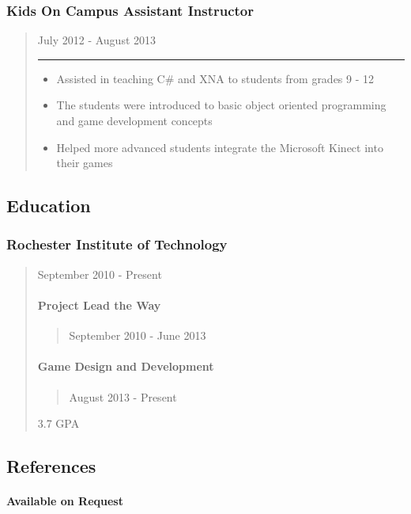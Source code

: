 \documentclass[a4paper,12pt]{article}
\begin{document}
\subsubsection{Kids On Campus Assistant
Instructor}\label{kids-on-campus-assistant-instructor}

\begin{quote}
July 2012 - August 2013

\begin{center}\rule{3in}{0.4pt}\end{center}

\begin{itemize}
\itemsep1pt\parskip0pt
\item
  Assisted in teaching C\# and XNA to students from grades 9 - 12
\item
  The students were introduced to basic object oriented programming and
  game development concepts
\item
  Helped more advanced students integrate the Microsoft Kinect into
  their games
\end{itemize}
\end{quote}

\subsection{Education}\label{education}

\subsubsection{Rochester Institute of
Technology}\label{rochester-institute-of-technology}

\begin{quote}
September 2010 - Present

\paragraph{Project Lead the Way}\label{project-lead-the-way}

\begin{quote}
September 2010 - June 2013
\end{quote}

\paragraph{Game Design and
Development}\label{game-design-and-development}

\begin{quote}
August 2013 - Present
\end{quote}

3.7 GPA
\end{quote}

\subsection{References}\label{references}

\paragraph{Available on Request}\label{available-on-request}
\end{document}
